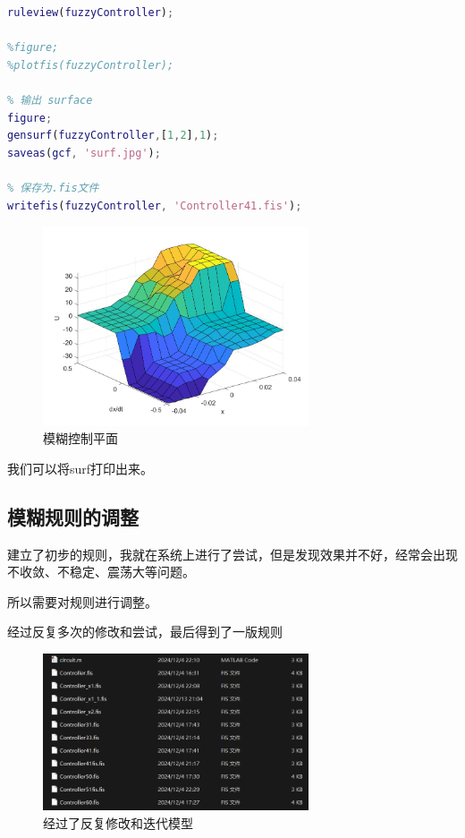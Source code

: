 \documentclass[12pt,a4paper,UTF8]{article}
\begin{document}
\begin{lstlisting}[language=Matlab,caption=可视化规则]
% 可视化规则
ruleview(fuzzyController);

%figure;
%plotfis(fuzzyController);

% 输出 surface
figure;
gensurf(fuzzyController,[1,2],1);
saveas(gcf, 'surf.jpg');

% 保存为.fis文件
writefis(fuzzyController, 'Controller41.fis');
\end{lstlisting}

\begin{figure}[htbp] \centering \includegraphics[width=0.7\textwidth]{figures/2024-12-13-22-06-11.png} \caption{模糊控制平面}  \end{figure}

我们可以将surf打印出来。

\newpage
\subsection{模糊规则的调整}

建立了初步的规则，我就在系统上进行了尝试，但是发现效果并不好，经常会出现不收敛、不稳定、震荡大等问题。

所以需要对规则进行调整。


经过反复多次的修改和尝试，最后得到了一版规则

\begin{figure}[htbp] \centering \includegraphics[width=0.7\textwidth]{figures/2024-12-13-22-12-39.png} \caption{经过了反复修改和迭代模型}  \end{figure}
\end{document}
